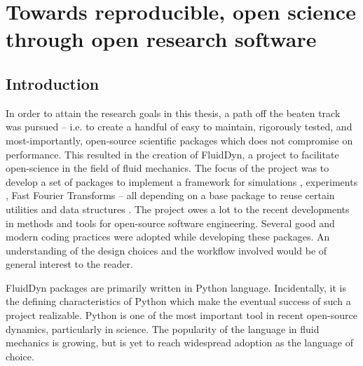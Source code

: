 \chapter{Towards reproducible, open science through open research software}
\section{Introduction}



%


In order to attain the research goals in this thesis, a path off the beaten
track was pursued -- i.e. to create a handful of easy to maintain, rigorously
tested, and most-importantly, open-source scientific packages which does not
compromise on performance.
%
This resulted in the creation of FluidDyn, a project to facilitate open-science
in the field of fluid mechanics.
%
The focus of the project was to develop a set of packages to implement a
framework for simulations \citep{fluidsim}, experiments
\citep{augier_fluidimage_2016,augier_fluidlab_nodate}, Fast Fourier Transforms
\citep{fluidfft} -- all depending on a base package to reuse certain utilities
and data structures \citep{fluiddyn}.
%
The project owes a lot to the recent developments in methods and tools for
open-source software engineering.
%
Several good and modern coding practices were adopted while developing these
packages.
%
An understanding of the design choices and the workflow involved would be of
general interest to the reader.

FluidDyn packages are primarily written in Python language. Incidentally, it is
the defining characteristics of Python which make the eventual success of such
a project realizable.
%
Python is one of the most important tool in recent open-source dynamics,
particularly in science.
%
The popularity of the language in fluid mechanics is growing, but is yet
to reach widespread adoption as the language of choice. 

